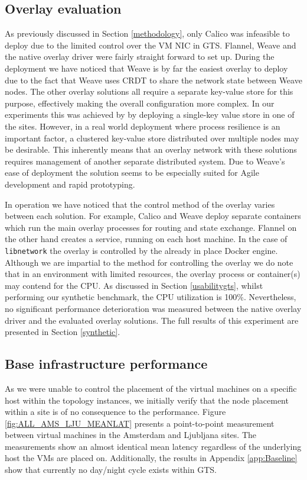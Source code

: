 \subsection{Overlay evaluation}
As previously discussed in Section \ref{methodology}, only Calico was infeasible to deploy due to the limited control over the VM NIC in GTS. Flannel, Weave and the native overlay driver were fairly straight forward to set up. During the deployment we have noticed that Weave is by far the easiest overlay to deploy due to the fact that Weave uses CRDT to share the network state between Weave nodes. The other overlay solutions all require a separate key-value store for this purpose, effectively making the overall configuration more complex. In our experiments this was achieved by by deploying a single-key value store in one of the sites. However, in a real world deployment where process resilience is an important factor, a clustered key-value store distributed over multiple nodes may be desirable. This inherently means that an overlay network with these solutions requires management of another separate distributed system. Due to Weave's ease of deployment the solution seems to be especially suited for Agile development and rapid prototyping.

In operation we have noticed that the control method of the overlay varies between each solution. For example, Calico and Weave deploy separate containers which run the main overlay processes for routing and state exchange. Flannel on the other hand creates a service, running on each host machine. In the case of \texttt{libnetwork} the overlay is controlled by the already in place Docker engine. Although we are impartial to the method for controlling the overlay we do note that in an environment with limited resources, the overlay process or container(s) may contend for the CPU. As discussed in Section \ref{usabilitygts}, whilst performing our synthetic benchmark, the CPU utilization is 100\%. Nevertheless, no significant performance deterioration was measured between the native overlay driver and the evaluated overlay solutions. The full results of this experiment are presented in Section \ref{synthetic}.


\subsection{Base infrastructure performance}
As we were unable to control the placement of the virtual machines on a specific host within the topology instances, we initially verify that the node placement within a site is of no consequence to the performance. Figure \ref{fig:ALL_AMS_LJU_MEANLAT} presents a point-to-point measurement between virtual machines in the Amsterdam and Ljubljana sites. The measurements show an almost identical mean latency regardless of the underlying host the VMs are placed on. Additionally, the results in Appendix \ref{app:Baseline} show that currently no day/night cycle exists within GTS. 

